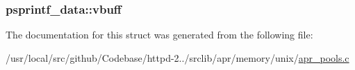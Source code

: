 \subsubsection[{\texorpdfstring{vbuff}{vbuff}}]{ psprintf\+\_\+data\+::vbuff}\hypertarget{structpsprintf__data_ae612062a52a2e9217811a6ce0dc642b0}{}\label{structpsprintf__data_ae612062a52a2e9217811a6ce0dc642b0}


The documentation for this struct was generated from the following file\+:\begin{DoxyCompactItemize}
\item 
/usr/local/src/github/\+Codebase/httpd-\/2../srclib/apr/memory/unix/\hyperlink{apr__pools_8c}{apr\+\_\+pools.\+c}\end{DoxyCompactItemize}

